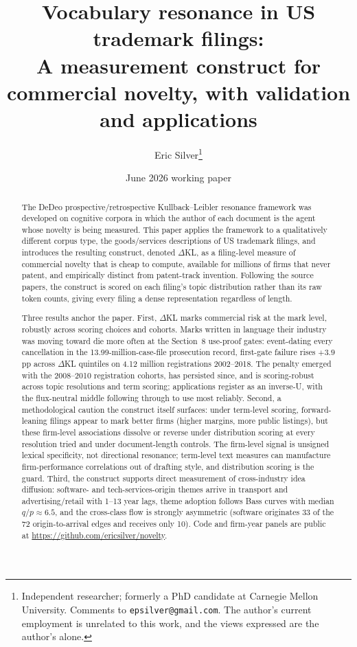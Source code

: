 \documentclass[11pt]{article}
\title{\bfseries Vocabulary resonance in US trademark filings:\\
\large A measurement construct for commercial novelty, with validation and applications}
\author{Eric Silver\thanks{Independent researcher; formerly a PhD candidate at Carnegie Mellon University. Comments to \texttt{epsilver@gmail.com}. The author's current employment is unrelated to this work, and the views expressed are the author's alone.}}
\date{June 2026 working paper}
\newcommand{\dkl}{$\Delta$KL}
\begin{document}
\maketitle

\begin{abstract}
\noindent The DeDeo prospective/retrospective Kullback--Leibler resonance
framework \citep{Murdock2017, Barron2018} was developed on cognitive
corpora in which the author of each document is the agent whose novelty is
being measured. This paper applies the framework to a qualitatively
different corpus type, the goods/services descriptions of US trademark
filings, and introduces the resulting construct, denoted \dkl{}, as a
filing-level measure of commercial novelty that is cheap to compute,
available for millions of firms that never patent, and empirically
distinct from patent-track invention. Following the source papers, the
construct is scored on each filing's topic distribution rather than its
raw token counts, giving every filing a dense representation regardless of
length.

\noindent Three results anchor the paper. First, \dkl{} marks commercial
risk at the mark level, robustly across scoring choices and cohorts. Marks
written in language their industry was moving toward die more often at the
Section~8 use-proof gates: event-dating every cancellation in the
13.99-million-case-file prosecution record, first-gate failure rises
$+3.9$pp across \dkl{} quintiles on 4.12 million registrations
2002--2018. The penalty emerged with the 2008--2010 registration cohorts,
has persisted since, and is scoring-robust across topic resolutions and
term scoring; applications register as an inverse-U, with the flux-neutral
middle following through to use most reliably. Second, a methodological
caution the construct itself surfaces: under term-level scoring,
forward-leaning filings appear to mark better firms (higher margins, more
public listings), but these firm-level associations dissolve or reverse
under distribution scoring at every resolution tried and under
document-length controls. The firm-level signal is unsigned lexical
specificity, not directional resonance; term-level text measures can
manufacture firm-performance correlations out of drafting style, and
distribution scoring is the guard. Third, the construct supports direct
measurement of cross-industry idea diffusion: software- and
tech-services-origin themes arrive in transport and advertising/retail
with 1--13 year lags, theme adoption follows Bass curves with median
$q/p \approx 6.5$, and the cross-class flow is strongly asymmetric
(software originates 33 of the 72 origin-to-arrival edges and receives
only 10). Code and firm-year panels are public at
\url{https://github.com/ericsilver/novelty}.
\end{abstract}
\end{document}
